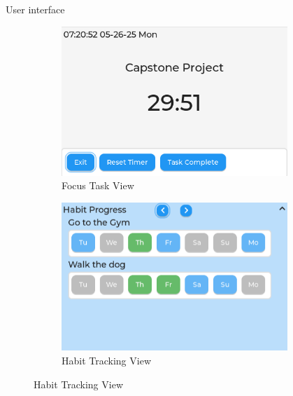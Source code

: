 \documentclass[final]{beamer}
\newlength{\sepwidth}
\newlength{\colwidth}
\newlength{\bigcolwidth}
\newcommand{\separatorcolumn}{\begin{column}{\sepwidth}\end{column}}
\begin{document}
\begin{frame}[t]
\begin{columns}
\begin{column}{\bigcolwidth}
\begin{block}{User interface}
\begin{figure}
\begin{subfigure}{0.24\textwidth}
            \includegraphics[width=\textwidth]{focusTile.png}
            \caption{Focus Task View}
          \end{subfigure}
          \hfill
          \begin{subfigure}{0.24\textwidth}
            \includegraphics[width=\textwidth]{habitTile.png}
            \caption{Habit Tracking View}
          \end{subfigure}
        \end{figure} 
      \end{block}
  \end{column}
  \separatorcolumn
  \end{columns}

\end{frame}
\end{document}
